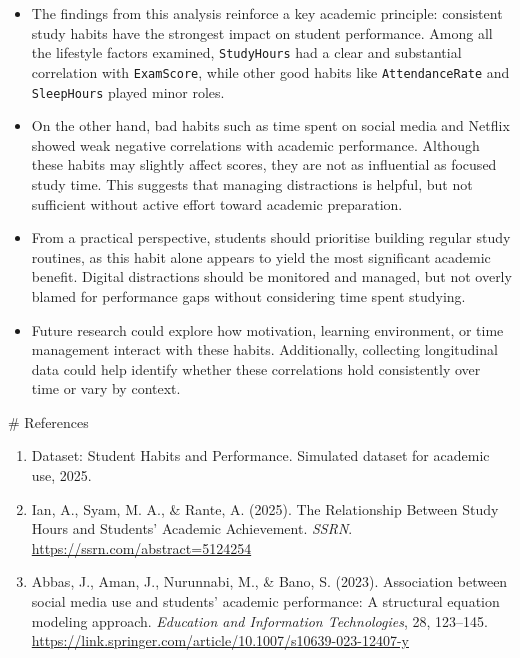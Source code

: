 \documentclass[
  11pt,
  letterpaper,
  DIV=11,
  numbers=noendperiod]{scrartcl}
\begin{document}
\begin{itemize}
\item
  The findings from this analysis reinforce a key academic principle:
  consistent study habits have the strongest impact on student
  performance. Among all the lifestyle factors examined,
  \texttt{StudyHours} had a clear and substantial correlation with
  \texttt{ExamScore}, while other good habits like
  \texttt{AttendanceRate} and \texttt{SleepHours} played minor roles.
\item
  On the other hand, bad habits such as time spent on social media and
  Netflix showed weak negative correlations with academic performance.
  Although these habits may slightly affect scores, they are not as
  influential as focused study time. This suggests that managing
  distractions is helpful, but not sufficient without active effort
  toward academic preparation.
\item
  From a practical perspective, students should prioritise building
  regular study routines, as this habit alone appears to yield the most
  significant academic benefit. Digital distractions should be monitored
  and managed, but not overly blamed for performance gaps without
  considering time spent studying.
\item
  Future research could explore how motivation, learning environment, or
  time management interact with these habits. Additionally, collecting
  longitudinal data could help identify whether these correlations hold
  consistently over time or vary by context.
\end{itemize}

\# References

\begin{enumerate}
\def\labelenumi{\arabic{enumi}.}
\item
  Dataset: Student Habits and Performance. Simulated dataset for
  academic use, 2025.
\item
  Ian, A., Syam, M. A., \& Rante, A. (2025). The Relationship Between
  Study Hours and Students' Academic Achievement. \emph{SSRN}.
  \url{https://ssrn.com/abstract=5124254}
\item
  Abbas, J., Aman, J., Nurunnabi, M., \& Bano, S. (2023). Association
  between social media use and students' academic performance: A
  structural equation modeling approach. \emph{Education and Information
  Technologies}, 28, 123--145.
  \url{https://link.springer.com/article/10.1007/s10639-023-12407-y}
\end{enumerate}
\end{document}
